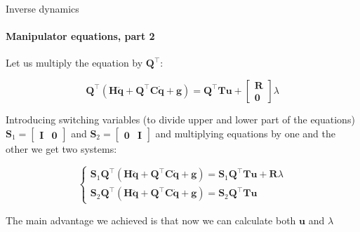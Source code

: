 \documentclass{beamer}
\begin{document}
\begin{frame}{Inverse dynamics}
\framesubtitle{Manipulator equations, part 2}
\begin{flushleft}

Let us multiply the equation by $\mathbf{Q}^\top$:

\begin{equation}
    \mathbf{Q}^\top (\mathbf{H}\ddot{\mathbf{q}} + \mathbf{Q}^\top\mathbf{C}\dot{\mathbf{q}} + \mathbf{g}) = \mathbf{Q}^\top\mathbf{T}\mathbf{u} + \begin{bmatrix} \mathbf{R} \\ \mathbf{0}  \end{bmatrix} \lambda
\end{equation}

Introducing switching variables (to divide upper and lower part of the equations) $\mathbf{S}_1 = \begin{bmatrix} \mathbf{I} & \mathbf{0}  \end{bmatrix}$ and $\mathbf{S}_2 = \begin{bmatrix} \mathbf{0} & \mathbf{I}  \end{bmatrix}$ and multiplying equations by one and the other we get two systems:

\begin{equation}
\begin{cases}
    \mathbf{S}_1 \mathbf{Q}^\top (\mathbf{H}\ddot{\mathbf{q}} + \mathbf{Q}^\top\mathbf{C}\dot{\mathbf{q}} + \mathbf{g}) = \mathbf{S}_1\mathbf{Q}^\top\mathbf{T}\mathbf{u} + \mathbf{R} \lambda \\
    \mathbf{S}_2 \mathbf{Q}^\top (\mathbf{H}\ddot{\mathbf{q}} + \mathbf{Q}^\top\mathbf{C}\dot{\mathbf{q}} + \mathbf{g}) = \mathbf{S}_2\mathbf{Q}^\top\mathbf{T}\mathbf{u}
\end{cases}
\end{equation}

The main advantage we achieved is that now we can calculate both $\mathbf{u}$ and $\lambda$

\end{flushleft}
\end{frame}
\end{document}
